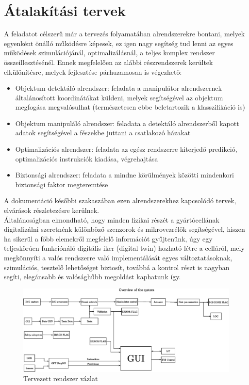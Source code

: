 \documentclass{article}
\begin{document}
\section{Átalakítási tervek}
A feladatot célszerű már a tervezés folyamatában alrendszerekre bontani, melyek egyenként önálló működésre képesek, ez igen nagy segítség tud lenni az egyes működések szimulációjánál, optimalizálásnál, a teljes komplex rendszer összeillesztésénél. Ennek megfelelően az alábbi részrendszerek kerültek elkülönítésre, melyek fejlesztése párhuzamosan is végezhető:
\begin{itemize}
    \item Objektum detektáló alrendszer: feladata a manipulátor alrendszernek általánosított koordinátákat küldeni, melyek segítségével az objektum megfogása megvalósulhat (természetesen ebbe beletartozik a klasszifikáció is)
    \item Objektum manipuláló alrendszer: feladata a detektáló alrendszerből kapott adatok segítségével a fészekbe juttani a csatlakozó házakat
    \item Optimalizációs alrendszer: feladata az egész rendszerre kiterjedő predikció, optimalizációs instrukciók kiadása, végrehajtása
    \item Biztonsági alrendszer: feladata a mindne körülmények közötti mindenkori biztonsági faktor megteremtése
\end{itemize}
A dokumentáció későbbi szakaszában ezen alrendszerekhez kapcsolódó tervek, elvárások részletezésre kerülnek.\vspace{5pt}\\
Általánoságban elmondható, hogy minden fizikai részét a gyártócellának digitalizálni szeretnénk különböző szenzorok és mikrovezrélők segítségével, hiszen ha sikerül a főbb elemekről megfelelő információt gyűjtenünk, úgy egy teljeskörúen funkciónáló digitális iker (digital twin)
hozható létre a celláról, mely megkönnyíti a valós rendszerre való implementálását egyes változtatásoknak, szimulációs, tesztelő lehetőséget biztosít, továbbá a kontrol részt is nagyban segíti, elegánsabb és valósághűbb megoldást kaphatunk így.\\
\begin{figure}[h]
    \includegraphics[scale = 0.6]{system_overview.eps}
    \caption{Tervezett rendszer vázlat}
\end{figure}
\newpage
\end{document}
